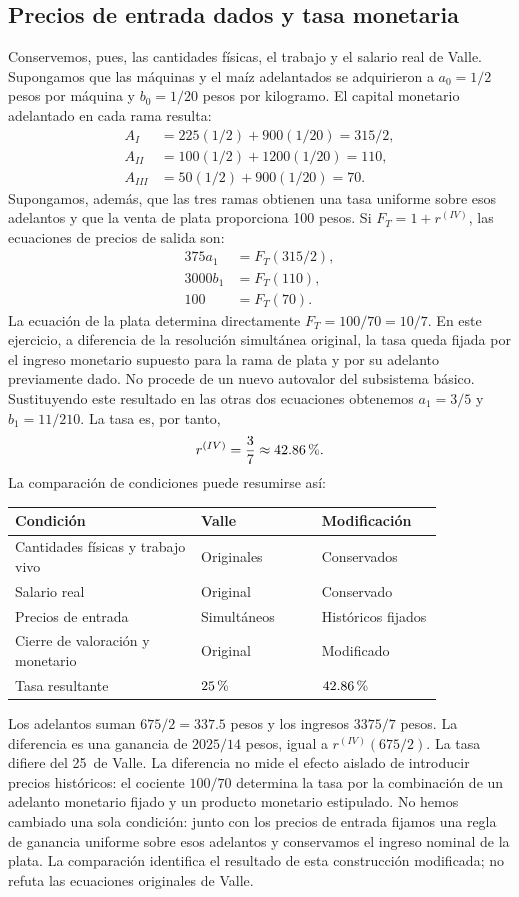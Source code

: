 \documentclass[10pt,twoside]{article}
\newcommand{\pct}{\ifmmode\text{\char37}\else\char37\fi}
\begin{document}
\subsection*{Precios de entrada dados y tasa monetaria}
Conservemos, pues, las cantidades físicas, el trabajo y el salario real de Valle. Supongamos que las máquinas y el maíz adelantados se adquirieron a $a_0=1/2$ pesos por máquina y $b_0=1/20$ pesos por kilogramo. El capital monetario adelantado en cada rama resulta:
\[
\begin{aligned}A_I&=225(1/2)+900(1/20)=315/2,\\A_{II}&=100(1/2)+1200(1/20)=110,\\A_{III}&=50(1/2)+900(1/20)=70.\end{aligned}
\]
Supongamos, además, que las tres ramas obtienen una tasa uniforme sobre esos adelantos y que la venta de plata proporciona 100 pesos. Si $F_T=1+r^{(IV)}$, las ecuaciones de precios de salida son:
\begin{align*}
375a_1&=F_T(315/2),\\
3000b_1&=F_T(110),\\
100&=F_T(70).
\end{align*}
La ecuación de la plata determina directamente $F_T=100/70=10/7$. En este ejercicio, a diferencia de la resolución simultánea original, la tasa queda fijada por el ingreso monetario supuesto para la rama de plata y por su adelanto previamente dado. No procede de un nuevo autovalor del subsistema básico. Sustituyendo este resultado en las otras dos ecuaciones obtenemos $a_1=3/5$ y $b_1=11/210$. La tasa es, por tanto,
\[
r^{(IV)}=\frac37\approx42.86\,\pct.
\]
La comparación de condiciones puede resumirse así:
\begin{center}
\begin{tabular}{@{}p{0.37\linewidth}p{0.24\linewidth}p{0.24\linewidth}@{}}
\toprule
Condición & Valle & Modificación\\\midrule
Cantidades físicas y trabajo vivo & Originales & Conservados\\
Salario real & Original & Conservado\\
Precios de entrada & Simultáneos & Históricos fijados\\
Cierre de valoración y monetario & Original & Modificado\\
Tasa resultante & $25\,\pct$ & $42.86\,\pct$\\\bottomrule
\end{tabular}
\end{center}
Los adelantos suman $675/2=337.5$ pesos y los ingresos $3375/7$ pesos. La diferencia es una ganancia de $2025/14$ pesos, igual a $r^{(IV)}(675/2)$. La tasa difiere del 25\,\pct{} de Valle. La diferencia no mide el efecto aislado de introducir precios históricos: el cociente $100/70$ determina la tasa por la combinación de un adelanto monetario fijado y un producto monetario estipulado. No hemos cambiado una sola condición: junto con los precios de entrada fijamos una regla de ganancia uniforme sobre esos adelantos y conservamos el ingreso nominal de la plata. La comparación identifica el resultado de esta construcción modificada; no refuta las ecuaciones originales de Valle.
\end{document}
